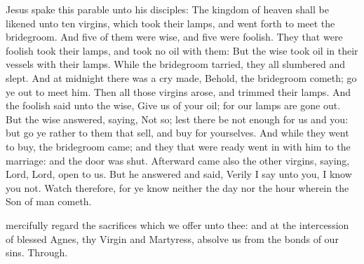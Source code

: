 
\tractnotice
{}

 Jesus spake this parable unto his disciples: The kingdom of heaven shall be likened unto ten virgins, which took their lamps, and went forth to meet the bridegroom. And five of them were wise, and five were foolish. They that were foolish took their lamps, and took no oil with them:  But the wise took oil in their vessels with their lamps. While the bridegroom tarried, they all slumbered and slept. And at midnight there was a cry made, Behold, the bridegroom cometh; go ye out to meet him. Then all those virgins arose, and trimmed their lamps. And the foolish said unto the wise, Give us of your oil; for our lamps are gone out. But the wise answered, saying, Not so; lest there be not enough for us and you: but go ye rather to them that sell, and buy for yourselves. And while they went to buy, the bridegroom came; and they that were ready went in with him to the marriage: and the door was shut. Afterward came also the other virgins, saying, Lord, Lord, open to us. But he answered and said, Verily I say unto you, I know you not. Watch therefore, for ye know neither the day nor the hour wherein the Son of man cometh.


\secret
{} mercifully regard the sacrifices which we offer unto thee: and at the intercession of blessed Agnes, thy Virgin and Martyress, absolve us from the bonds of our sins. Through.


